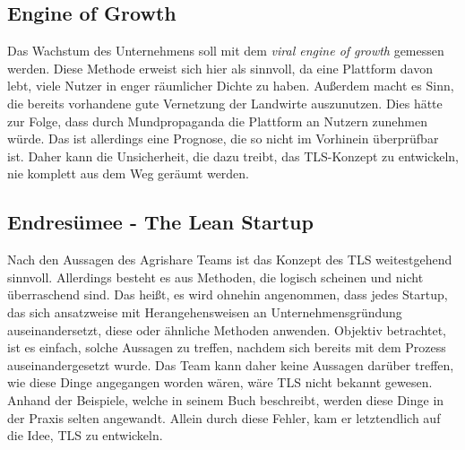 \subsection*{\label{sec:LeanStartup-Umsetzung-EngineOfGrowth}\thesubsection\quad Engine of Growth}Das Wachstum des Unternehmens soll mit dem \textit{viral engine of growth} gemessen werden. Diese Methode erweist sich hier als sinnvoll, da eine Plattform davon lebt, viele Nutzer in enger räumlicher Dichte zu haben. Außerdem macht es Sinn, die bereits vorhandene gute Vernetzung der Landwirte auszunutzen. Dies hätte zur Folge, dass durch Mundpropaganda die Plattform an Nutzern zunehmen würde. Das ist allerdings eine Prognose, die so nicht im Vorhinein überprüfbar ist. Daher kann die Unsicherheit, die \citeauthor{Sprint} dazu treibt, das \ac{TLS}-Konzept zu entwickeln, nie komplett aus dem Weg geräumt werden.

\subsection*{\label{sec:LeanStartup-Umsetzung-Evaluierung}\thesubsection\quad Endresümee - The Lean Startup}Nach den Aussagen des Agrishare Teams ist das Konzept des \ac{TLS} weitestgehend sinnvoll. Allerdings besteht es aus Methoden, die logisch scheinen und nicht überraschend sind. Das heißt, es wird ohnehin angenommen, dass jedes Startup, das sich ansatzweise mit Herangehensweisen an Unternehmensgründung auseinandersetzt, diese oder ähnliche Methoden anwenden. Objektiv betrachtet, ist es einfach, solche Aussagen zu treffen, nachdem sich bereits mit dem Prozess auseinandergesetzt wurde. Das Team kann daher keine Aussagen darüber treffen, wie diese Dinge angegangen worden wären, wäre \ac{TLS} nicht bekannt gewesen. Anhand der Beispiele, welche \citeauthor{Sprint} \citeyear{Sprint} in seinem Buch beschreibt, werden diese Dinge in der Praxis selten angewandt. Allein durch diese Fehler, kam er letztendlich auf die Idee, \ac{TLS} zu entwickeln.


